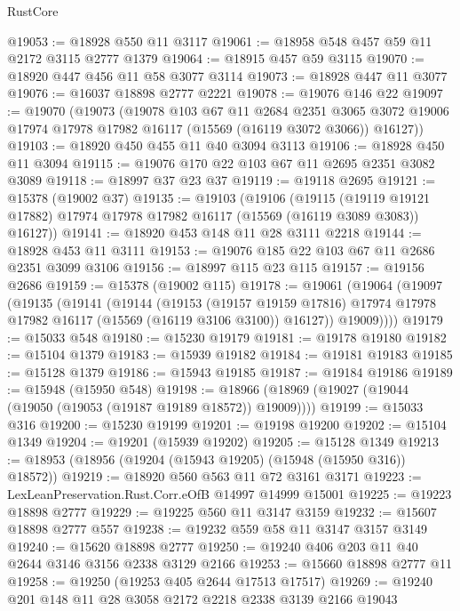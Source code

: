 \begin{lexlean}{RustCore}
\begin{coremodule}
@19053 := @18928 @550 @11 @3117
@19061 := @18958 @548 @457 @59 @11 @2172 @3115 @2777 @1379
@19064 := @18915 @457 @59 @3115
@19070 := @18920 @447 @456 @11 @58 @3077 @3114
@19073 := @18928 @447 @11 @3077
@19076 := @16037 @18898 @2777 @2221
@19078 := @19076 @146 @22
@19097 := @19070
    (@19073
      (@19078
        @103
        @67
        @11
        @2684
        @2351
        @3065
        @3072
        @19006
        @17974
        @17978
        @17982
        @16117
        (@15569 (@16119 @3072 @3066))
        @16127))
@19103 := @18920 @450 @455 @11 @40 @3094 @3113
@19106 := @18928 @450 @11 @3094
@19115 := @19076 @170 @22 @103 @67 @11 @2695 @2351 @3082 @3089
@19118 := @18997 @37 @23 @37
@19119 := @19118 @2695
@19121 := @15378 (@19002 @37)
@19135 := @19103
    (@19106
      (@19115
        (@19119 @19121 @17882)
        @17974
        @17978
        @17982
        @16117
        (@15569 (@16119 @3089 @3083))
        @16127))
@19141 := @18920 @453 @148 @11 @28 @3111 @2218
@19144 := @18928 @453 @11 @3111
@19153 := @19076 @185 @22 @103 @67 @11 @2686 @2351 @3099 @3106
@19156 := @18997 @115 @23 @115
@19157 := @19156 @2686
@19159 := @15378 (@19002 @115)
@19178 := @19061
    (@19064
      (@19097
        (@19135
          (@19141
            (@19144
              (@19153
                (@19157 @19159 @17816)
                @17974
                @17978
                @17982
                @16117
                (@15569 (@16119 @3106 @3100))
                @16127))
            @19009))))
@19179 := @15033 @548
@19180 := @15230 @19179
@19181 := @19178 @19180
@19182 := @15104 @1379
@19183 := @15939 @19182
@19184 := @19181 @19183
@19185 := @15128 @1379
@19186 := @15943 @19185
@19187 := @19184 @19186
@19189 := @15948 (@15950 @548)
@19198 := @18966 (@18969 (@19027 (@19044 (@19050 (@19053 (@19187 @19189 @18572)) @19009))))
@19199 := @15033 @316
@19200 := @15230 @19199
@19201 := @19198 @19200
@19202 := @15104 @1349
@19204 := @19201 (@15939 @19202)
@19205 := @15128 @1349
@19213 := @18953 (@18956 (@19204 (@15943 @19205) (@15948 (@15950 @316)) @18572))
@19219 := @18920 @560 @563 @11 @72 @3161 @3171
@19223 := LexLeanPreservation.Rust.Corr.eOfB @14997 @14999 @15001
@19225 := @19223 @18898 @2777
@19229 := @19225 @560 @11 @3147 @3159
@19232 := @15607 @18898 @2777 @557
@19238 := @19232 @559 @58 @11 @3147 @3157 @3149
@19240 := @15620 @18898 @2777
@19250 := @19240 @406 @203 @11 @40 @2644 @3146 @3156 @2338 @3129 @2166
@19253 := @15660 @18898 @2777 @11
@19258 := @19250 (@19253 @405 @2644 @17513 @17517)
@19269 := @19240 @201 @148 @11 @28 @3058 @2172 @2218 @2338 @3139 @2166 @19043

\end{coremodule}
\end{lexlean}
